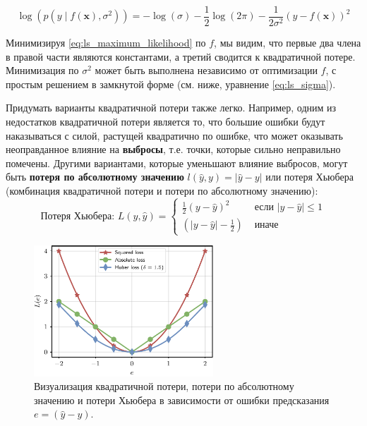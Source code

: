 \begin{equation}
\log(p(y \mid f(\mathbf{x}), \sigma^2)) = -\log(\sigma) - \frac{1}{2}\log(2\pi) - \frac{1}{2\sigma^2}(y - f(\mathbf{x}))^2
\label{eq:ls_maximum_likelihood}
\end{equation}

Минимизируя \eqref{eq:ls_maximum_likelihood} по $f$, мы видим, что первые два члена в правой части являются константами, а третий сводится к квадратичной потере. Минимизация по $\sigma^2$ может быть выполнена независимо от оптимизации $f$, с простым решением в замкнутой форме (см. ниже, уравнение \eqref{eq:ls_sigma}).

Придумать варианты квадратичной потери также легко. Например, одним из недостатков квадратичной потери является то, что большие ошибки будут наказываться с силой, растущей квадратично по ошибке, что может оказывать неоправданное влияние на \textbf{выбросы}, т.е. точки, которые сильно неправильно помечены. Другими вариантами, которые уменьшают влияние выбросов, могут быть \textbf{потеря по абсолютному значению} $l(\hat{y}, y) = \lvert \hat{y} - y \rvert$ или потеря Хьюбера (комбинация квадратичной потери и потери по абсолютному значению):
%
\begin{equation}
\text{Потеря Хьюбера: } L(y, \hat{y}) = \begin{cases} \frac{1}{2}\left(y - \hat{y}\right)^2 & \text{ если } \lvert y - \hat{y} \rvert \le 1 \\ \left(\lvert y - \hat{y} \rvert - \frac{1}{2}\right) & \text{ иначе } \end{cases}
\end{equation}
%
\begin{figure}
    \centering
    \hspace{1em}\includegraphics[width=0.6\textwidth]{images/loss_functions_regression.pdf}
    \caption{Визуализация квадратичной потери, потери по абсолютному значению и потери Хьюбера в зависимости от ошибки предсказания $e = (\hat{y} - y)$.}
    \label{fig:losses_regression}
\end{figure}

